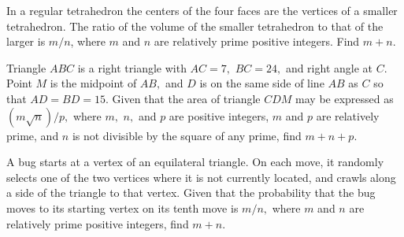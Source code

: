 %	












\begin{question}[name={2003 AIME II, \href{https://artofproblemsolving.com/community/c4p713207}{Problem 4}}]
	In a regular tetrahedron the centers of the four faces are the vertices of a smaller tetrahedron. The ratio of the volume of the smaller tetrahedron to that of the larger is $m/n$, where $m$ and $n$ are relatively prime positive integers. Find $m+n.$	
	
\end{question}


%	








\begin{question}[name={2003 AIME II, \href{https://artofproblemsolving.com/community/c4p713218}{Problem 11}}]
	Triangle $ABC$ is a right triangle with $AC=7,$ $BC=24,$ and right angle at $C.$ Point $M$ is the midpoint of $AB,$ and $D$ is on the same side of line $AB$ as $C$ so that $AD=BD=15.$ Given that the area of triangle $CDM$ may be expressed as $(m\sqrt{n})/{p},$ where $m,$ $n,$ and $p$ are positive integers, $m$ and $p$ are relatively prime, and $n$ is not divisible by the square of any prime, find $m+n+p.$
\end{question}


%	












\begin{question}[name={2003 AIME II, \href{https://artofproblemsolving.com/community/c4p713221}{Problem 13}}]
	A bug starts at a vertex of an equilateral triangle. On each move, it randomly selects one of the two vertices where it is not currently located, and crawls along a side of the triangle to that vertex. Given that the probability that the bug moves to its starting vertex on its tenth move is $m/n,$ where $m$ and $n$ are relatively prime positive integers, find $m+n$.
\end{question}


